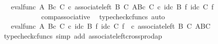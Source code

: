 \begin{isabellebody}
\ {\isachardoublequoteopen}{\isachardot}{\kern0pt}{\isachardot}{\kern0pt}{\isachardot}{\kern0pt}\ {\isacharequal}{\kern0pt}\ {\isacharparenleft}{\kern0pt}eval{\isacharunderscore}{\kern0pt}func\ A\ {\isacharparenleft}{\kern0pt}B{\isasymtimes}\isactrlsub c\ C{\isacharparenright}{\kern0pt}{\isacharparenright}{\kern0pt}\ {\isasymcirc}\isactrlsub c\ {\isacharparenleft}{\kern0pt}associate{\isacharunderscore}{\kern0pt}left\ B\ C\ {\isacharparenleft}{\kern0pt}A\isactrlbsup {\isacharparenleft}{\kern0pt}B{\isasymtimes}\isactrlsub c\ C{\isacharparenright}{\kern0pt}\isactrlesup {\isacharparenright}{\kern0pt}{\isacharparenright}{\kern0pt}\ {\isasymcirc}\isactrlsub c\ {\isacharparenleft}{\kern0pt}id\isactrlsub c\ B\ {\isasymtimes}\isactrlsub f\ {\isacharparenleft}{\kern0pt}id\isactrlsub c\ C\ {\isasymtimes}\isactrlsub f\ {\isasympsi}\isactrlsup {\isasymsharp}{\isacharparenright}{\kern0pt}{\isacharparenright}{\kern0pt}{\isachardoublequoteclose}\isanewline
\ \ \ \ \ \ \ \ \ \ \isamarkupfalse%
\ comp{\isacharunderscore}{\kern0pt}associative{}\ \isamarkupfalse%
\ {\isacharparenleft}{\kern0pt}typecheck{\isacharunderscore}{\kern0pt}cfuncs{\isacharcomma}{\kern0pt}\ auto{\isacharparenright}{\kern0pt}\isanewline
\ \ \ \ \ \ \ \ \isamarkupfalse%
\ \isamarkupfalse%
\ {\isachardoublequoteopen}{\isachardot}{\kern0pt}{\isachardot}{\kern0pt}{\isachardot}{\kern0pt}\ {\isacharequal}{\kern0pt}\ {\isacharparenleft}{\kern0pt}eval{\isacharunderscore}{\kern0pt}func\ A\ {\isacharparenleft}{\kern0pt}B{\isasymtimes}\isactrlsub c\ C{\isacharparenright}{\kern0pt}{\isacharparenright}{\kern0pt}\ {\isasymcirc}\isactrlsub c\ {\isacharparenleft}{\kern0pt}{\isacharparenleft}{\kern0pt}id\isactrlsub c\ B\ {\isasymtimes}\isactrlsub f\ id\isactrlsub c\ C{\isacharparenright}{\kern0pt}\ {\isasymtimes}\isactrlsub f\ {\isasympsi}\isactrlsup {\isasymsharp}{\isacharparenright}{\kern0pt}\ {\isasymcirc}\isactrlsub c\ associate{\isacharunderscore}{\kern0pt}left\ B\ C\ {\isacharparenleft}{\kern0pt}{\isacharparenleft}{\kern0pt}A\isactrlbsup B\isactrlesup {\isacharparenright}{\kern0pt}\isactrlbsup C\isactrlesup {\isacharparenright}{\kern0pt}{\isachardoublequoteclose}\isanewline
\ \ \ \ \ \ \ \ \ \ \isamarkupfalse%
\ {\isacharparenleft}{\kern0pt}typecheck{\isacharunderscore}{\kern0pt}cfuncs{\isacharcomma}{\kern0pt}\ simp\ add{\isacharcolon}{\kern0pt}\ associate{\isacharunderscore}{\kern0pt}left{\isacharunderscore}{\kern0pt}crossprod{\isacharunderscore}{\kern0pt}ap{\isacharparenright}{\kern0pt}\isanewline
\ \ \ \ \ \ \ \ \isamarkupfalse%

\end{isabellebody}
